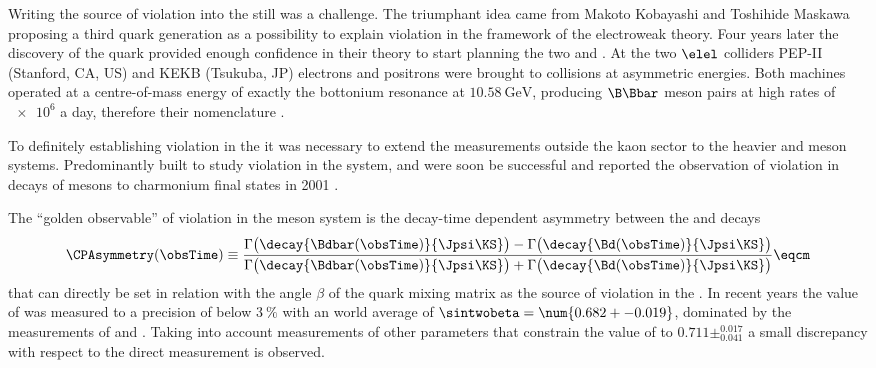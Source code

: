Writing the source of \CP violation into the \SM still was a challenge. The
triumphant idea came from Makoto Kobayashi and Toshihide Maskawa
\cite{Kobayashi:1973fv} proposing a third quark generation as a possibility to
explain \CP violation in the framework of the electroweak theory. Four years
later the discovery of the \bquark quark \cite{Herb:1977ek} provided enough
confidence in their theory to start planning the two \BFactories \Babar and
\Belle. At the two $\elel$ colliders PEP-II (Stanford, CA, US) and KEKB
(Tsukuba, JP) electrons and positrons were brought to collisions at asymmetric
energies. Both machines operated at a centre-of-mass energy of exactly the
\YFourS bottonium resonance at $\SI{10.58}{\GeV}$, producing $\B\Bbar$ meson
pairs at high rates of $\num{e6}$ a day, therefore their nomenclature
\cite{Bevan:2014iga}.

To definitely establishing \CP violation in the \SM it was necessary to extend
the measurements outside the kaon sector to the heavier \B and \D meson systems.
Predominantly built to study \CP violation in the \Bmeson system, \Babar and
\Belle were soon be successful and reported the observation of \CP violation in
decays of \Bd mesons to charmonium final states in 2001
\cite{Aubert:2001nu,Abe:2001xe}.

The \enquote{golden observable} \cite{Bevan:2014iga} of \CP violation in the \Bd
meson system is the decay-time dependent \CP asymmetry between the  \BdToJpsiKS
and \BdbarToJpsiKS decays
%
\begin{equation*}\label{eq:cpv_theory:bd2jpsiks:cp_asymmetry}
    \CPAsymmetry(\obsTime) \equiv 
      \frac{\Gamma\bigl(\decay{\Bdbar(\obsTime)}{\Jpsi\KS}\bigr) - \Gamma\bigl(\decay{\Bd(\obsTime)}{\Jpsi\KS}\bigr)}
           {\Gamma\bigl(\decay{\Bdbar(\obsTime)}{\Jpsi\KS}\bigr) + \Gamma\bigl(\decay{\Bd(\obsTime)}{\Jpsi\KS}\bigr)} \eqcm
\end{equation*}
%
that can directly be set in relation with the angle $\beta$ of the \CKM quark
mixing matrix as the source of \CP violation in the \SM. In recent years the
value of \sintwobeta was measured to a precision of below $\SI{3}{\percent}$
with an world average of $\sintwobeta = \num{0.682 +- 0.019}$, dominated by the
measurements of \Babar and \Belle \cite{Amhis:2014hma}. Taking into account
measurements of other parameters that constrain the value of \sintwobeta to
$0.711\pm^{0.017}_{0.041}$ \cite{Charles:2015gya} a small discrepancy with
respect to the direct measurement is observed.

